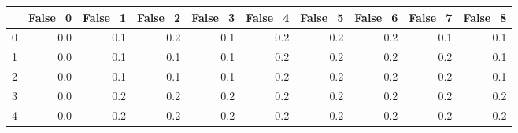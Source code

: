 \begin{tabular}{lrrrrrrrrr}
\toprule
{} &  False\_0 &  False\_1 &  False\_2 &  False\_3 &  False\_4 &  False\_5 &  False\_6 &  False\_7 &  False\_8 \\ \hline
\midrule
0 &      0.0 &      0.1 &      0.2 &      0.1 &      0.2 &      0.2 &      0.2 &      0.1 &      0.1 \\ \hline
1 &      0.0 &      0.1 &      0.1 &      0.1 &      0.2 &      0.2 &      0.2 &      0.2 &      0.1 \\ \hline
2 &      0.0 &      0.1 &      0.1 &      0.1 &      0.2 &      0.2 &      0.2 &      0.2 &      0.1 \\ \hline
3 &      0.0 &      0.2 &      0.2 &      0.2 &      0.2 &      0.2 &      0.2 &      0.2 &      0.2 \\ \hline
4 &      0.0 &      0.2 &      0.2 &      0.2 &      0.2 &      0.2 &      0.2 &      0.2 &      0.2 \\ \hline
\bottomrule
\end{tabular}
